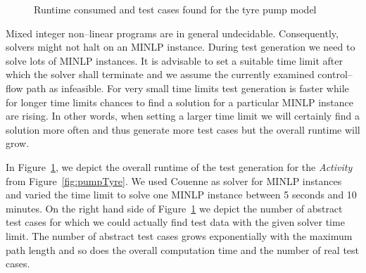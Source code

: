 \documentclass[runningheads,a4paper]{llncs}%
\newcommand{\UMLType}[1]{\textsf{\textit{#1}}} %
\begin{document}
\begin{figure}
%
\caption{Runtime consumed and test cases found for the tyre pump model%
}%
\label{fig:ExplodingTyresRuntime}%
\end{figure}%
Mixed integer non--linear programs are in general undecidable. Consequently,
solvers might not halt on an MINLP instance. During test generation we need to
solve lots of MINLP instances. It is advisable to set a suitable time limit
after which the solver shall terminate and we assume the currently examined
control--flow path as infeasible. For very small time limits test generation is
faster while for longer time limits chances to find a solution for a particular
MINLP instance are rising. In other words, when setting a larger time limit we
will certainly find a solution more often and thus generate more test cases but
the overall runtime will grow.

In Figure~\ref{fig:ExplodingTyresRuntime}, we depict the overall runtime of the
test generation for the \UMLType{Activity} from Figure~\ref{fig:pumpTyre}. We
used Couenne as solver for MINLP instances and varied the time limit to solve
one MINLP instance between 5 seconds and 10 minutes. On the right hand side of
Figure~\ref{fig:ExplodingTyresRuntime} we depict the number of abstract test
cases for which we could actually find test data with the given solver time
limit. The number of abstract test cases grows exponentially with the maximum
path length and so does the overall computation time and the number of real test
cases.
\end{document}
